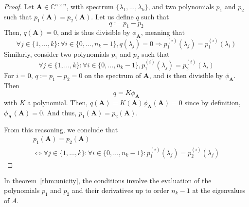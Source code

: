 \documentclass[11pt]{article}
\numberwithin{equation}{section}
\begin{document}
\begin{proof}
    Let $\mathbf{A}\in\mathbb{C}^{n\times n}$, with spectrum $\{\lambda_1,\ldots,\lambda_k\}$, and two polynomials $p_1$ and $p_2$ such that $p_1(\mathbf{A})=p_2(\mathbf{A})$. Let us define $q$ such that
    \begin{equation*}
        q := p_1 - p_2
    \end{equation*}
    Then, $q(\mathbf{A})=0$, and is thus divisible by $\phi_{\mathbf{A}}$, meaning that
    \begin{equation*}
        \forall j\in\{1,\dots,k\}:\forall i\in\{0,\ldots,n_k-1\}, q(\lambda_j) = 0 \Rightarrow p_1^{(i)}(\lambda_j) = p_1^{(i)}(\lambda_i)
    \end{equation*}
    Similarly, consider two polynomials $p_1$ and $p_2$ such that 
    \begin{equation*}
        \forall j\in\{1,\dots,k\}:\forall i\in\{0,\ldots,n_k-1\},  p_1^{(i)}(\lambda_j) = p_2^{(i)}(\lambda_i)    
    \end{equation*}
    For $i=0$, $q:=p_1-p_2=0$ on the spectrum of $\mathbf{A}$, and is then divisible by $\phi_{\mathbf{A}}$. Then
    \begin{equation*}
        q = K\phi_{\mathbf{A}}
    \end{equation*}
    with $K$ a polynomial. Then, $q(\mathbf{A})=K(\mathbf{A})\phi_{\mathbf{A}}(\mathbf{A}) = 0$ since by definition, $\phi_{\mathbf{A}}(\mathbf{A}) = 0$. And thus, $p_1(\mathbf{A})=p_2(\mathbf{A})$.

    From this reasoning, we conclude that 
    \begin{align*}
        p_1(\mathbf{A}) = p_2(\mathbf{A}) \\ \Leftrightarrow \forall j\in\{1,\ldots,k\}:\forall i\in\{0,\ldots,n_k-1\}: p_1^{(i)}(\lambda_j)=p_2^{(i)}(\lambda_j)
    \end{align*}
\end{proof}
In theorem~\ref{thm:unicity}, the conditions involve the evaluation of the polynomials $p_1$ and $p_2$ and their derivatives up to order $n_k-1$ at the eigenvalues of $A$.
\end{document}
